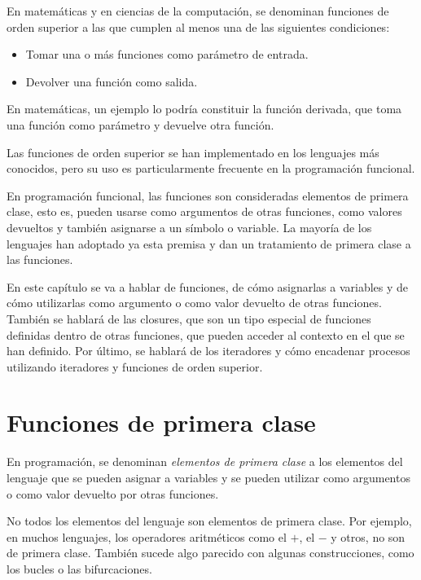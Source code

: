 \begin{Resumen}
En matemáticas y en ciencias de la computación, se denominan funciones de orden superior a las que cumplen al menos una de las siguientes condiciones:

\begin{itemize}
   \item Tomar una o más funciones como parámetro de entrada.
   \item Devolver una función como salida.
\end{itemize}

En matemáticas, un ejemplo lo podría constituir la función derivada, que toma una función como parámetro y devuelve otra función.

\smallskip

Las funciones de orden superior se han implementado en los lenguajes más conocidos, pero su uso es particularmente frecuente en la programación funcional. 

\smallskip

En programación funcional, las funciones son consideradas elementos de primera clase, esto es, pueden usarse como argumentos de otras funciones, como valores devueltos y también asignarse a un símbolo o variable. La mayoría de los lenguajes han adoptado ya esta premisa y dan un tratamiento de primera clase a las funciones.

\smallskip

En este capítulo se va a hablar de funciones, de cómo asignarlas a variables y de cómo  utilizarlas como argumento o como valor devuelto de otras funciones. También se hablará de las closures, que son un tipo especial de funciones definidas dentro de otras funciones, que pueden acceder al contexto en el que se han definido. Por último, se hablará de los iteradores y cómo encadenar procesos utilizando iteradores y funciones de orden superior.

\end{Resumen}

\section{Funciones de primera clase}
En programación, se denominan \textit{elementos de primera clase} a los elementos del lenguaje que se pueden asignar a variables y se pueden utilizar como argumentos o como valor devuelto por otras funciones.

No todos los elementos del lenguaje son elementos de primera clase. Por ejemplo, en muchos lenguajes, los operadores aritméticos como el $+$, el $-$ y otros, no son de primera clase. También sucede algo parecido con algunas construcciones, como los bucles o las bifurcaciones.

